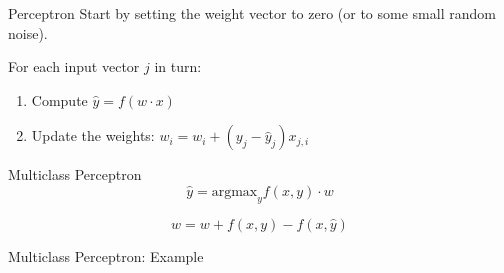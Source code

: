 \begin{frame}{Perceptron}
  Start by setting the weight vector to zero (or to some small random noise).

  \vspace{5mm}
  For each input vector $j$ in turn:
  \begin{enumerate}
  \item Compute $\hat{y} = f(w\cdot x)$
  \item Update the weights: $w_{i} = w_{i} + (y_j - \hat{y}_j) x_{j,i}$
  \end{enumerate}
\end{frame}

\begin{frame}{Multiclass Perceptron}
  \begin{displaymath}
    \hat{y} = \mbox{argmax}_y f(x, y)\cdot w
  \end{displaymath}

  \begin{displaymath}
    w = w + f(x,y) - f(x,\hat{y})
  \end{displaymath}
\end{frame}

\begin{frame}{Multiclass Perceptron: Example}
\end{frame}

